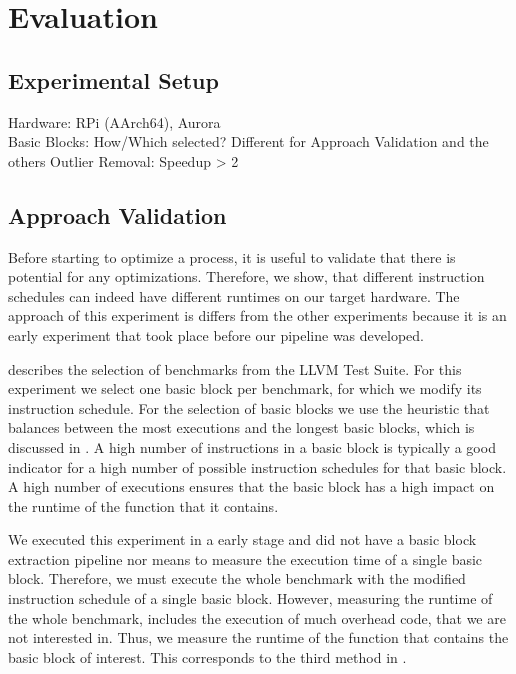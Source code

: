 \chapter{Evaluation}
\label{eval:svm}
\section{Experimental Setup}
\label{sec:eval:hw}
Hardware: RPi (AArch64), Aurora\\
Basic Blocks: How/Which selected? Different for Approach Validation and the others
Outlier Removal: Speedup > 2

\section{Approach Validation}
Before starting to optimize a process, it is useful to validate that there is potential for any optimizations.
Therefore, we show, that different instruction schedules can indeed have different runtimes on our target hardware.
The approach of this experiment is differs from the other experiments because it is an early experiment that took place before our pipeline was developed.

 describes the selection of benchmarks from the LLVM Test Suite.
For this experiment we select one basic block per benchmark, for which we modify its instruction schedule.
For the selection of basic blocks we use the heuristic that balances between the most executions and the longest basic blocks, which is discussed in .
A high number of instructions in a basic block is typically a good indicator for a high number of possible instruction schedules for that basic block. 
A high number of executions ensures that the basic block has a high impact on the runtime of the function that it contains.

We executed this experiment in a early stage and did not have a basic block extraction pipeline nor means to measure the execution time of a single basic block.
Therefore, we must execute the whole benchmark with the modified instruction schedule of a single basic block.
However, measuring the runtime of the whole benchmark, includes the execution of much overhead code, that we are not interested in.
Thus, we measure the runtime of the function that contains the basic block of interest.
This corresponds to the third method in .

